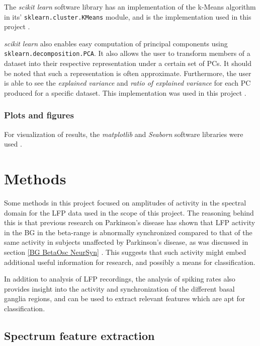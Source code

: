 \documentclass{kththesis}
\begin{document}
The \textit{scikit learn} software library has an implementation of the k-Means algorithm in its' \texttt{sklearn.cluster.KMeans} module, and is the implementation used in this project \parencite{SKLEARN}.

\textit{scikit learn} also enables easy computation of principal components using \texttt{sklearn.decomposition.PCA}.
It also allows the user to transform members of a dataset into their respective representation under a certain set of PCs. 
It should be noted that such a representation is often approximate.
Furthermore, the user is able to see the \textit{explained variance} and \textit{ratio of explained variance} for each PC produced for a specific dataset. 
This implementation was used in this project \parencite{SKLEARN}.

\subsection{Plots and figures}

For visualization of results, the \textit{matplotlib} and \textit{Seaborn} software libraries were used \parencite{MPL} \parencite{Seaborn}.

\newpage
\chapter{Methods}

Some methods in this project focused on amplitudes of activity in the spectral domain for the LFP data used in the scope of this project.
The reasoning behind this is that previous research on Parkinson's disease has shown that LFP activity in the BG in the beta-range is abnormally synchronized compared to that of the same activity in subjects unaffected by Parkinson's disease, as was discussed in section \ref{BG BetaOsc NeurSyn} \parencite{Cagnan}.
This suggests that such activity might embed additional useful information for research, and possibly a means for classification. 

In addition to analysis of LFP recordings, the analysis of spiking rates also provides insight into the activity and synchronization of the different basal ganglia regions, and can be used to extract relevant features which are apt for classification.

\section{Spectrum feature extraction}\label{DFT Method}
\end{document}
